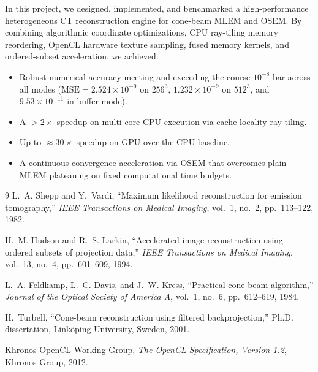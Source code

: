 \documentclass[11pt,a4paper]{article}
\begin{document}
In this project, we designed, implemented, and benchmarked a high-performance heterogeneous CT reconstruction engine for cone-beam MLEM and OSEM. By combining algorithmic coordinate optimizations, CPU ray-tiling memory reordering, OpenCL hardware texture sampling, fused memory kernels, and ordered-subset acceleration, we achieved:
\begin{itemize}[noitemsep]
    \item Robust numerical accuracy meeting and exceeding the course $10^{-8}$ bar across all modes ($\text{MSE} = 2.524 \times 10^{-9}$ on $256^3$, $1.232 \times 10^{-9}$ on $512^3$, and $9.53 \times 10^{-11}$ in buffer mode).
    \item A $>2\times$ speedup on multi-core CPU execution via cache-locality ray tiling.
    \item Up to $\approx 30\times$ speedup on GPU over the CPU baseline.
    \item A continuous convergence acceleration via OSEM that overcomes plain MLEM plateauing on fixed computational time budgets.
\end{itemize}

\begin{thebibliography}{9}
L.~A. Shepp and Y.~Vardi, ``Maximum likelihood reconstruction for emission tomography,'' \emph{IEEE Transactions on Medical Imaging}, vol.~1, no.~2, pp.~113--122, 1982.

H.~M. Hudson and R.~S. Larkin, ``Accelerated image reconstruction using ordered subsets of projection data,'' \emph{IEEE Transactions on Medical Imaging}, vol.~13, no.~4, pp.~601--609, 1994.

L.~A. Feldkamp, L.~C. Davis, and J.~W. Kress, ``Practical cone-beam algorithm,'' \emph{Journal of the Optical Society of America A}, vol.~1, no.~6, pp.~612--619, 1984.

H.~Turbell, ``Cone-beam reconstruction using filtered backprojection,'' Ph.D. dissertation, Linköping University, Sweden, 2001.

Khronos OpenCL Working Group, \emph{The OpenCL Specification, Version 1.2}, Khronos Group, 2012.
\end{thebibliography}
\end{document}

